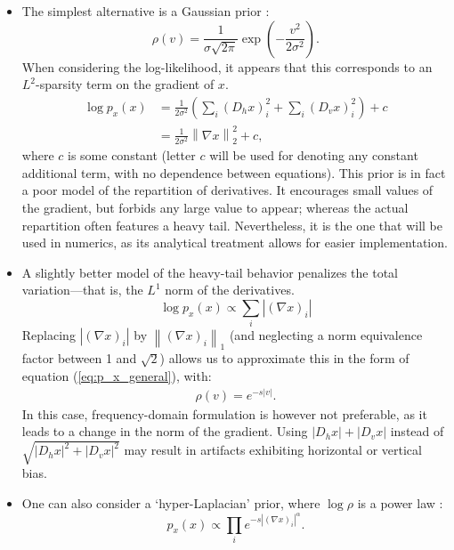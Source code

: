 \documentclass[english,a4paper]{article}
\theoremstyle{plain}
\theoremstyle{definition}
\theoremstyle{remark}
\newcommand{\norm}[1]{\left\lVert #1 \right\rVert}
\begin{document}
\begin{itemize}
	\item The simplest alternative is a Gaussian prior \cite{levin2011efficient}:
	\begin{equation}\label{eq:rho_gaussian}
	\rho(v) = \frac{1}{\sigma \sqrt{2\pi}} \exp\left( -\frac{v^2}{2\sigma^2} \right) .
	\end{equation}
	When considering the log-likelihood, it appears that this corresponds to an $L^2$-sparsity term on the gradient of $x$.
	\begin{align*}
	\log p_x(x) & = \frac{1}{2\sigma^2} \left( 
	\sum_i (D_h x)_i^2 
	+ \sum_i (D_v x)_i^2
	\right) + c\\
	& = \frac{1}{2\sigma^2} \norm{\nabla x}_2^2 +c ,
	\end{align*}
	where $c$ is some constant (letter $c$ will be used for denoting any constant additional term, with no dependence between equations).
	This prior is in fact a poor model of the repartition of derivatives. It encourages small values of the gradient, but forbids any large value to appear; whereas the actual repartition often features a heavy tail.
	Nevertheless, it is the one that will be used in numerics, as its analytical treatment allows for easier implementation.
	\item A slightly better model of the heavy-tail behavior penalizes the total variation---that is, the $L^1$ norm of the derivatives.
	\begin{equation}\label{eq:TV}
	\log p_x(x) \propto \sum_i |(\nabla x)_i|
	\end{equation}
	Replacing $|(\nabla x)_i|$ by $\norm{(\nabla x)_i}_1$ (and neglecting a norm equivalence factor between 1 and $\sqrt{2}$) allows us to approximate this in the form of equation (\ref{eq:p_x_general}), with:
	\begin{align*}
	\rho(v) = e^{-s|v|} .
	\end{align*}
	In this case, frequency-domain formulation is however not preferable, as it leads to a change in the norm of the gradient. Using $|D_h x| + |D_v x|$ instead of $\sqrt{|D_h x|^2 + |D_v x|^2}$ may result in artifacts exhibiting horizontal or vertical bias.
	\item One can also consider a `hyper-Laplacian' prior, where $\log \rho$ is a power law \cite{krishnan2009fast, levin2009understanding}:
	\begin{equation}\label{eq:p_hyper_laplacian}
	p_x(x) \propto \prod_i e^{-s|(\nabla x)_i|^\alpha}.
	\end{equation}

\end{itemize}
\end{document}
